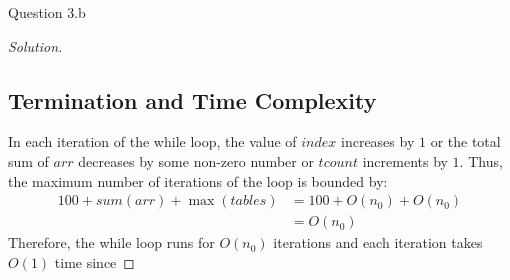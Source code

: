 \begin{solution}{Question 3.b}
\begin{proof}[Solution]
        \subsection*{Termination and Time Complexity}
        In each iteration of the while loop, the value of $index$ increases by $1$ or the total sum of $arr$ decreases by some non-zero number or $tcount$ increments by $1$. Thus, the maximum number of iterations of the loop is bounded by:
        \begin{equation}
            \begin{split}
                100+sum(arr)+\max(tables)&=100+O(n_0)+O(n_0)\\
                &=O(n_0)
            \end{split}
        \end{equation}
        Therefore, the while loop runs for $O(n_0)$ iterations and each iteration takes $O(1)$ time since 
    \end{proof}
    
\end{solution}
